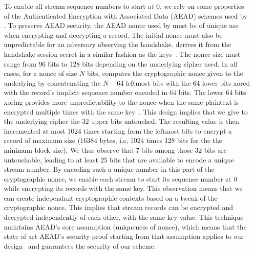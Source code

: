 To enable all stream sequence numbers to start at 0, we rely on some properties
of the Authenticated Encryption with Associated Data (AEAD) schemes used by . To preserve AEAD security, the AEAD nonce used by \tcpls must be of unique
use when encrypting and decrypting a record. The initial nonce must also be
unpredictable for an adversary observing the handshake. \tcpls derives it from
the \tls handshake session secret in a similar fashion as the \tls
keys~\cite{rfc8446}. The nonce size must range from $96$ bits to $128$ bits
depending on the underlying cipher used. In all cases, for a nonce of size $N$
bits, \tls computes the cryptographic nonce given to the underlying by
concatenating the $N-64$ leftmost bits with the 64 lower bits xored with the
record's implicit sequence number encoded in 64 bits.  The lower 64 bits xoring
provides more unpredictability to the nonce when the same plaintext is encrypted
multiple times with the same key~\cite{bellare2016multi,hoang2018multi}. This
design implies that we give to the underlying cipher the 32 upper bits
untouched. The resulting value is then incremented at most 1024 times starting
from the leftmost bits to encrypt a \tls record of maximum size (16384 bytes,
i.e, 1024 times 128 bits for the the
minimum block size). We thus observe that 7 bits among those 32 bits are
untouchable, leading to at least 25 bits that are available to encode a unique
stream number. By encoding such a unique number in this part of the
cryptographic nonce, we enable each stream to start its sequence number at 0
while encrypting its records with the same key. This observation means that we
can create independant cryptographic contexts based on a tweak of the
cryptographic nonce. This implies that stream records can be encrypted and
decrypted independently of each other, with the same key value. This technique
maintains AEAD's core assumption (uniqueness of nonce), which means that the
state of art AEAD's security proof starting from that assumption applies to our
design~\cite{chatterjee2011another} and guarantees the security of our scheme.

